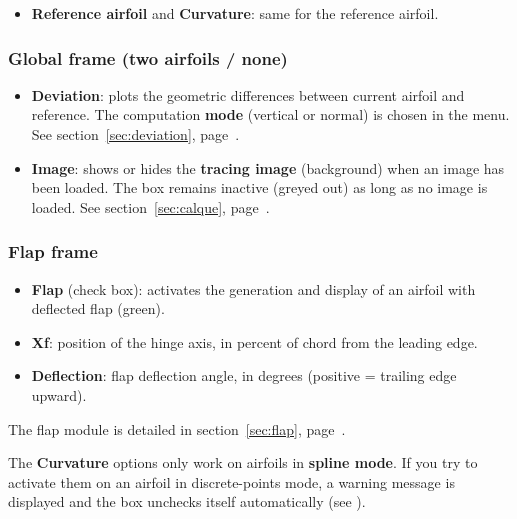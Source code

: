 \begin{itemize}
    \item \textbf{Reference airfoil} and \textbf{Curvature}:
        same for the reference airfoil.
\end{itemize}

\subsubsection*{Global frame (two airfoils / none)}

\begin{itemize}
    \item \textbf{Deviation}: plots the geometric differences
        between current airfoil and reference. The computation
        \textbf{mode} (vertical or normal) is chosen in the
         menu. See
        section~\ref{sec:deviation}, page~\pageref{sec:deviation}.
    \item \textbf{Image}: shows or hides the \textbf{tracing image}
        (background) when an image has been loaded. The box remains
        inactive (greyed out) as long as no image is loaded. See
        section~\ref{sec:calque}, page~\pageref{sec:calque}.
\end{itemize}

\subsubsection*{\og Flap \fg{} frame}

\begin{itemize}
    \item \textbf{Flap} (check box): activates the generation and
        display of an airfoil with deflected flap (green).
    \item \textbf{Xf}: position of the hinge axis, in percent of
        chord from the leading edge.
    \item \textbf{Deflection}: flap deflection angle, in degrees
        (positive = trailing edge upward).
\end{itemize}

The flap module is detailed in section~\ref{sec:flap},
page~\pageref{sec:flap}.

\begin{important}
The \textbf{Curvature} options only work on airfoils in
\textbf{spline mode}. If you try to activate them on an airfoil in
discrete-points mode, a warning message is displayed and the box
unchecks itself automatically (see ).
\end{important}

